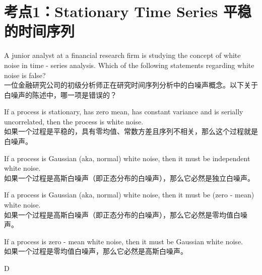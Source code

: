 \documentclass{article}
\newcounter{question} %
\begin{document}
 \tableofcontents %
\newpage





\section{考点1：Stationary Time Series 平稳的时间序列}
\setcounter{question}{0}

\begin{question}
    A junior analyst at a financial research firm is studying the concept of white noise in time - series analysis. Which of the following statements regarding white noise is false?\\
    一位金融研究公司的初级分析师正在研究时间序列分析中的白噪声概念。以下关于白噪声的陈述中，哪一项是错误的？
    \end{question}
    
    \begin{choices}
        \item If a process is stationary, has zero mean, has constant variance and is serially uncorrelated, then the process is white noise.\\
        如果一个过程是平稳的，具有零均值、常数方差且序列不相关，那么这个过程就是白噪声。
        \item If a process is Gaussian (aka, normal) white noise, then it must be independent white noise.\\
        如果一个过程是高斯白噪声（即正态分布的白噪声），那么它必然是独立白噪声。
        \item If a process is Gaussian (aka, normal) white noise, then it must be (zero - mean) white noise.\\
        如果一个过程是高斯白噪声（即正态分布的白噪声），那么它必然是零均值白噪声。
        \item If a process is zero - mean white noise, then it must be Gaussian white noise.\\
        如果一个过程是零均值白噪声，那么它必然是高斯白噪声。
    \end{choices}
    
    \begin{correctanswer}
        D
    \end{correctanswer}
    
\end{document}
